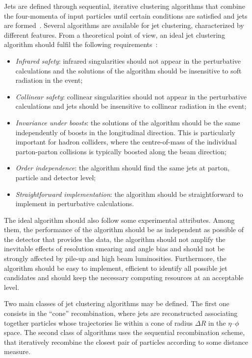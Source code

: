 Jets are defined through sequential, iterative clustering algorithms that combine the four-momenta of input particles until certain conditions are satisfied and jets are formed~\cite{Salam:2009jx}. Several algorithms are available for jet clustering, characterized by different features. From a theoretical point of view, an ideal jet clustering algorithm should fulfil the following requirements~\cite{Blazey:2000qt}:
\begin{itemize}
\item \emph{Infrared safety}: infrared singularities should not appear in the perturbative calculations and the solutions of the algorithm should be insensitive to soft radiation in the event;
\item \emph{Collinear safety}: collinear singularities should not appear in the perturbative calculations and jets should be insensitive to collinear radiation in the event;
\item \emph{Invariance under boosts}: the solutions of the algorithm should be the same independently of boosts in the longitudinal direction. This is particularly important for hadron colliders, where the centre-of-mass of the individual parton-parton collisions is typically boosted along the beam direction;
\item \emph{Order independence}: the algorithm should find the same jets at parton, particle and detector level;
\item \emph{Straightforward implementation}: the algorithm should be straightforward to implement in perturbative calculations.
\end{itemize}
The ideal algorithm should also follow some experimental attributes. Among them, the performance of the algorithm should be as independent as possible of the detector that provides the data, the algorithm should not amplify the inevitable effects of resolution smearing and angle bias and should not be strongly affected by pile-up and high beam luminosities. Furthermore, the algorithm should be easy to implement, efficient to identify all possible jet candidates and should keep the necessary computing resources at an acceptable level.

Two main classes of jet clustering algorithms may be defined. The first one consists in the ``cone'' recombination, where jets are reconstructed associating together particles whose trajectories lie within a cone of radius $\Delta R$ in the $\eta$--$\phi$ space. The second class of algorithms uses the sequential recombination scheme, that iteratively recombine the closest pair of particles according to some distance measure.

